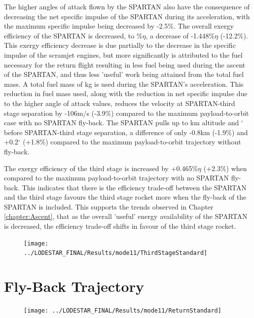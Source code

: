 The higher angles of attack flown by the SPARTAN also have the consequence of decreasing the net specific impulse of the SPARTAN during its acceleration, with the maximum specific impulse being decreased by -2.5\%.
The overall exergy efficiency of the SPARTAN is decreased, to \secondExergyEffStandard\%$\eta$, a decrease of -1.448\%$\eta$ (-12.2\%). This exergy efficiency decrease is due partially to the decrease in the specific impulse of the scramjet engines, but more significantly is attributed to the fuel necessary for the return flight resulting in less fuel being used during the ascent of the SPARTAN, and thus less 'useful' work being attained from the total fuel mass.
A total fuel mass of \returnFuelStandard kg is used during the SPARTAN's acceleration. This reduction in fuel mass used, along with the reduction in net specific impulse due to the higher angle of attack values, reduces the velocity at SPARTAN-third stage separation by -106m/s (-3.9\%) compared to the maximum payload-to-orbit case with no SPARTAN fly-back. The SPARTAN pulls up to \secondthirdSeparationAltStandard km altitude and \secondthirdSeparationgammaStandard $^\circ$ before SPARTAN-third stage separation, a difference of only -0.8km (-1.9\%) and +0.2$^\circ$ (+1.8\%) compared to the maximum payload-to-orbit trajectory without fly-back. 

The exergy efficiency of the third stage is increased by +0.465\%$\eta$ (+2.3\%) when compared to the maximum payload-to-orbit trajectory with no SPARTAN fly-back. This indicates that there is the efficiency trade-off between the SPARTAN and the third stage favours the third stage rocket more when the fly-back of the SPARTAN is included. This supports the trends observed in Chapter \ref{chapter:Ascent}, that as the overall 'useful' energy availability of the SPARTAN is decreased, the efficiency trade-off shifts in favour of the third stage rocket.  


\begin{figure}[ht!]
\centering
\texttt{[image: ../LODESTAR\_FINAL/Results/mode11/ThirdStageStandard]}
\caption{}
\label{fig:ThirdStageStandard}
\end{figure}


\section{Fly-Back Trajectory}

\begin{figure}[ht!]
	\centering
	\texttt{[image: ../LODESTAR\_FINAL/Results/mode11/ReturnStandard]}
	\caption{}
	\label{fig:ReturnStandard}
\end{figure}

